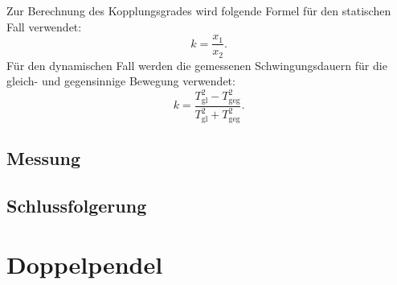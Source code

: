\documentclass[11pt,a4paper,titlepage, ngerman]{article}
\begin{document}
			Zur Berechnung des Kopplungsgrades wird folgende Formel für den statischen Fall verwendet: 
			\begin{equation}
				k = \frac{x_1}{x_2}.
			\end{equation}
			Für den dynamischen Fall werden die gemessenen Schwingungsdauern für die gleich- und gegensinnige Bewegung verwendet:
			\begin{equation}
			k = \frac{T_\text{gl}^2-T_\text{geg}^2}{T_\text{gl}^2+T_\text{geg}^2}.
			\end{equation}
		\subsection{Messung}
			
			
		\subsection{Schlussfolgerung}
							
				
	\section{Doppelpendel}
				
\end{document}

